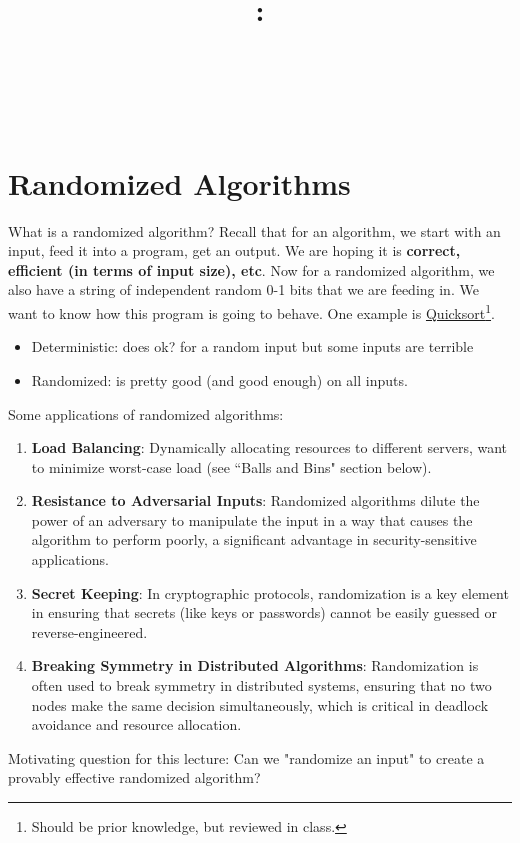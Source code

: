 \documentclass[14pt]{extreport}
\title{
    \vspace{1.75in}
    \textbf{\lectClass:\\ \lectTitle}\\
    \vspace{0.1in}\large{\textit{\lectClassInstructor\ \lectSection}}
    \vspace{2in}
    \author{\textbf{\lectAuthorName}}
    \date{}
}
\begin{document}
\maketitle
\pagebreak

\chapter*{Randomized Algorithms}
    What is a randomized algorithm? Recall that for an algorithm, we start with an input, feed it into a program, get an output. We are hoping it is \textbf{correct, efficient (in terms of input size), etc}. Now for a randomized algorithm, we also have a string of independent random 0-1 bits that we are feeding in.  We want to know how this program is going to behave. One example is \href{https://www.cs.cmu.edu/afs/cs/academic/class/15451-s07/www/lecture_notes/lect0123.pdf}{Quicksort}\footnote{Should be prior knowledge, but reviewed in class.}.
    \begin{itemize}
        \item Deterministic: does ok? for a random input but some inputs are terrible 
        \item Randomized: is pretty good (and good enough) on all inputs.
    \end{itemize}
    Some applications of randomized algorithms:
    \begin{enumerate}[label=\arabic*.]
        \item \textbf{Load Balancing}: Dynamically allocating resources to different servers, want to minimize worst-case load (see ``Balls and Bins" section below).
        \item \textbf{Resistance to Adversarial Inputs}: Randomized algorithms dilute the power of an adversary to manipulate the input in a way that causes the algorithm to perform poorly, a significant advantage in security-sensitive applications.
        \item \textbf{Secret Keeping}: In cryptographic protocols, randomization is a key element in ensuring that secrets (like keys or passwords) cannot be easily guessed or reverse-engineered.
        \item \textbf{Breaking Symmetry in Distributed Algorithms}: Randomization is often used to break symmetry in distributed systems, ensuring that no two nodes make the same decision simultaneously, which is critical in deadlock avoidance and resource allocation.
    \end{enumerate}
    Motivating question for this lecture: Can we "randomize an input" to create a provably effective randomized algorithm?
\end{document}
